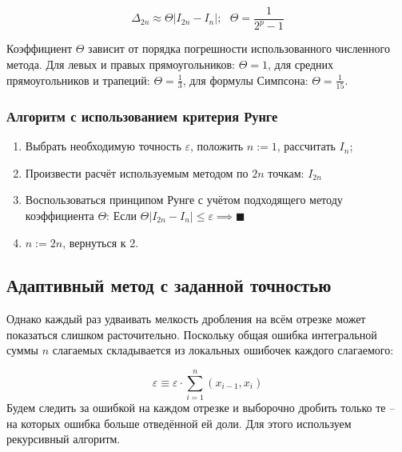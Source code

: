 \documentclass[a4paper, 14pt]{article}
\begin{document}
\begin{equation}
    \Delta_{2n} \approx \Theta \left|I_{2n} - I_n\right|;~~~\Theta=\dfrac{1}{2^p-1}
\end{equation}

Коэффициент $\Theta$ зависит от порядка погрешности использованного численного метода. Для левых и правых прямоугольников: $\Theta=1$, для средних прямоугольников и трапеций: $\Theta=\frac{1}{3}$, для формулы Симпсона: $\Theta=\frac{1}{15}$.

\subsubsection{Алгоритм с использованием критерия Рунге}
\begin{enumerate}
    \item Выбрать необходимую точность $\varepsilon$, положить $n:=1$, рассчитать $I_n$;

    \item Произвести расчёт используемым методом по $2n$ точкам: $I_{2n}$

    \item Воспользоваться принципом Рунге с учётом подходящего методу коэффициента $\Theta$:
    Если $\Theta \left|I_{2n} - I_n\right| \le \varepsilon \implies \blacksquare$

    \item $n:= 2n$, вернуться к 2.
\end{enumerate}

\subsection{Адаптивный метод с заданной точностью}

Однако каждый раз удваивать мелкость дробления на всём отрезке может показаться слишком расточительно. Поскольку общая ошибка интегральной суммы $n$ слагаемых складывается из локальных ошибочек каждого слагаемого:

\begin{equation}
    \varepsilon \equiv \varepsilon\cdot\sum_{i=1}^{n} (x_{i-1}, x_i)
\end{equation}
Будем следить за ошибкой на каждом отрезке и выборочно дробить только те -- на которых ошибка больше отведённой ей доли. Для этого используем рекурсивный алгоритм.
\end{document}
